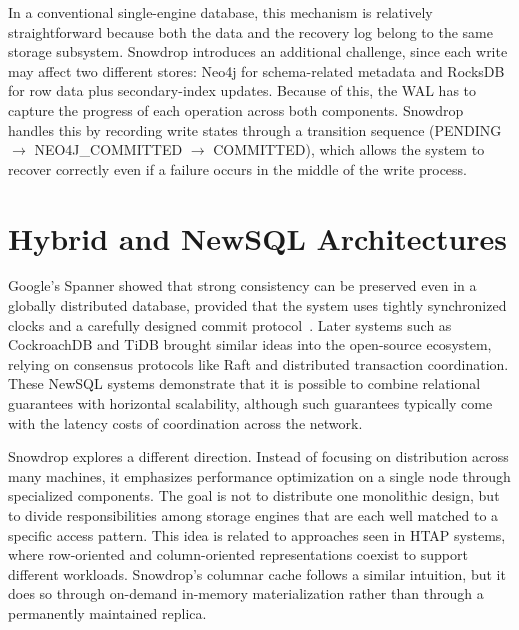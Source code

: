 In a conventional single-engine database, this mechanism is relatively straightforward because both the data and the recovery log belong to the same storage subsystem. Snowdrop introduces an additional challenge, since each write may affect two different stores: Neo4j for schema-related metadata and RocksDB for row data plus secondary-index updates. Because of this, the WAL has to capture the progress of each operation across both components. Snowdrop handles this by recording write states through a transition sequence (PENDING $\rightarrow$ NEO4J\_COMMITTED $\rightarrow$ COMMITTED), which allows the system to recover correctly even if a failure occurs in the middle of the write process.

\section{Hybrid and NewSQL Architectures}

Google’s Spanner showed that strong consistency can be preserved even in a globally distributed database, provided that the system uses tightly synchronized clocks and a carefully designed commit protocol~\cite{corbett2012}. Later systems such as CockroachDB and TiDB brought similar ideas into the open-source ecosystem, relying on consensus protocols like Raft and distributed transaction coordination. These NewSQL systems demonstrate that it is possible to combine relational guarantees with horizontal scalability, although such guarantees typically come with the latency costs of coordination across the network.

Snowdrop explores a different direction. Instead of focusing on distribution across many machines, it emphasizes performance optimization on a single node through specialized components. The goal is not to distribute one monolithic design, but to divide responsibilities among storage engines that are each well matched to a specific access pattern. This idea is related to approaches seen in HTAP systems, where row-oriented and column-oriented representations coexist to support different workloads. Snowdrop’s columnar cache follows a similar intuition, but it does so through on-demand in-memory materialization rather than through a permanently maintained replica.
